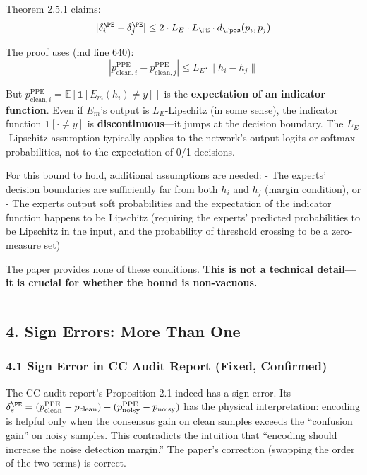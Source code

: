 \documentclass[
  12pt,
]{article}
\begin{document}
Theorem 2.5.1 claims:
\[|\delta_i^{\PE} - \delta_j^{\PE}| \leq 2 \cdot L_E \cdot L_{\PE} \cdot d_{\Ppos}(p_i, p_j)\]

The proof uses (md line 640):
\[|p_{\text{clean}, i}^{\text{PPE}} - p_{\text{clean}, j}^{\text{PPE}}| \leq L_E \cdot \|h_i - h_j\|\]

But \(p_{\text{clean}, i}^{\text{PPE}} = \mathbb{E}[\mathbf{1}[E_m(h_i) \neq y]]\) is the \textbf{expectation of an indicator function}. Even if \(E_m\)'s output is \(L_E\)-Lipschitz (in some sense), the indicator function \(\mathbf{1}[\cdot \neq y]\) is \textbf{discontinuous}---it jumps at the decision boundary. The \(L_E\)-Lipschitz assumption typically applies to the network's output logits or softmax probabilities, not to the expectation of 0/1 decisions.

For this bound to hold, additional assumptions are needed:
- The experts' decision boundaries are sufficiently far from both \(h_i\) and \(h_j\) (margin condition), or
- The experts output soft probabilities and the expectation of the indicator function happens to be Lipschitz (requiring the experts' predicted probabilities to be Lipschitz in the input, and the probability of threshold crossing to be a zero-measure set)

The paper provides none of these conditions. \textbf{This is not a technical detail---it is crucial for whether the bound is non-vacuous.}

\begin{center}\rule{0.5\linewidth}{0.5pt}\end{center}

\subsection{4. Sign Errors: More Than One}\label{sign-errors}

\subsubsection{4.1 Sign Error in CC Audit Report (Fixed, Confirmed)}\label{sign-error-cc}

The CC audit report's Proposition 2.1 indeed has a sign error. Its
\(\delta_s^{\PE} = (p_{\text{clean}}^{\text{PPE}} - p_{\text{clean}}) - (p_{\text{noisy}}^{\text{PPE}} - p_{\text{noisy}})\)
has the physical interpretation: encoding is helpful only when the consensus gain on clean samples exceeds the ``confusion gain'' on noisy samples. This contradicts the intuition that ``encoding should increase the noise detection margin.'' The paper's correction (swapping the order of the two terms) is correct.
\end{document}
